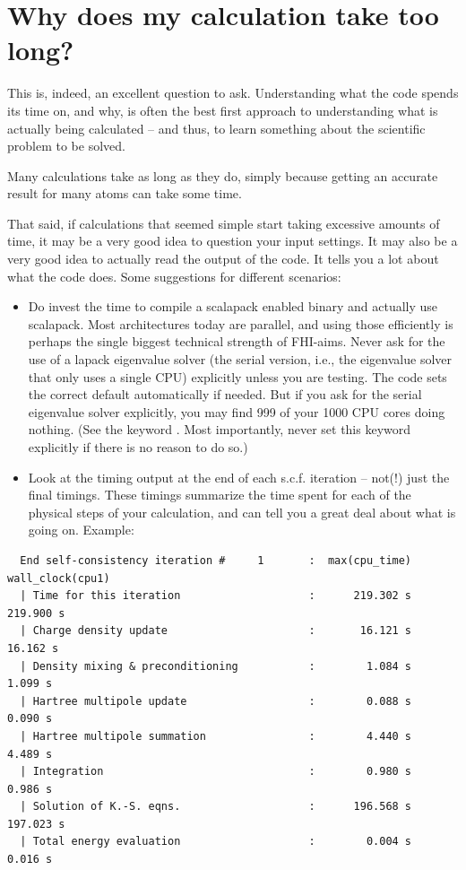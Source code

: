 \section{Why does my calculation take too long?}

This is, indeed, an excellent question to ask. Understanding what the
code spends its time on, and why, is often the best first approach to
understanding what is actually being calculated -- and thus, to learn
something about the scientific problem to be solved.

Many calculations take as long as they do, simply because getting an
accurate result for many atoms can take some time.

That said, if calculations that seemed simple start taking
excessive amounts of time, it may be a very good idea to question your
input settings. It may also be a very good idea to actually read the
output of the code. It tells you a lot about what the code
does. Some suggestions for different scenarios:

\begin{itemize}
  \item Do invest the time to compile a scalapack enabled binary and
    actually use scalapack. Most architectures today are parallel, and
    using those efficiently is perhaps the single biggest technical
    strength of FHI-aims. Never 
    ask for the use of a lapack eigenvalue solver (the serial version,
    i.e., the eigenvalue solver that only uses a single CPU)
    explicitly unless you are testing. The code sets the correct default
    automatically if needed. But if you ask for the serial eigenvalue
    solver explicitly, you may find 999 of your 1000 CPU cores doing
    nothing. (See the keyword . Most importantly,
    never set this keyword explicitly if there is no reason to do so.)  
  \item Look at the timing output at the end of each
    s.c.f. iteration -- not(!) just the final timings. These timings
    summarize the time spent for each of the physical steps of your
    calculation, and can tell you a 
    great deal about what is going on. Example:
\end{itemize}
\small
\begin{verbatim}
  End self-consistency iteration #     1       :  max(cpu_time)    wall_clock(cpu1)
  | Time for this iteration                    :      219.302 s         219.900 s
  | Charge density update                      :       16.121 s          16.162 s
  | Density mixing & preconditioning           :        1.084 s           1.099 s
  | Hartree multipole update                   :        0.088 s           0.090 s
  | Hartree multipole summation                :        4.440 s           4.489 s
  | Integration                                :        0.980 s           0.986 s
  | Solution of K.-S. eqns.                    :      196.568 s         197.023 s
  | Total energy evaluation                    :        0.004 s           0.016 s
\end{verbatim}
\normalsize

